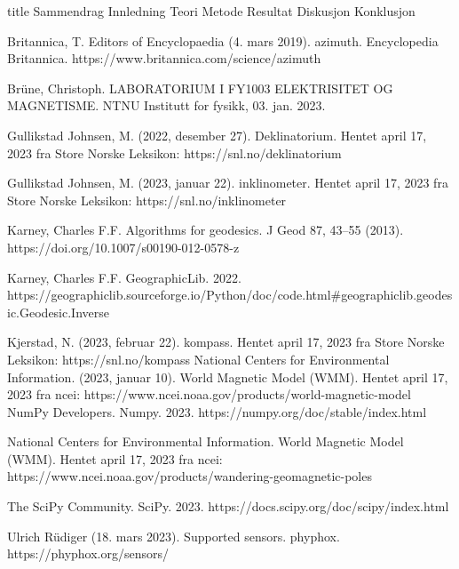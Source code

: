 \documentclass[5p]{article}
\begin{document}
{title} %
{Sammendrag}
\pagebreak
{Innledning}
{Teori}
{Metode}
{Resultat}
{Diskusjon}
{Konklusjon}

\begin{thebibliography}{5}
 Britannica, T. Editors of Encyclopaedia (4. mars 2019). azimuth. Encyclopedia Britannica. https://www.britannica.com/science/azimuth

Brüne, Christoph. LABORATORIUM I FY1003 ELEKTRISITET OG MAGNETISME. NTNU Institutt for fysikk, 03. jan. 2023.


Gullikstad Johnsen, M. (2022, desember 27). Deklinatorium. Hentet april 17, 2023 fra Store Norske Leksikon: https://snl.no/deklinatorium

Gullikstad Johnsen, M. (2023, januar 22). inklinometer. Hentet april 17, 2023 fra Store Norske Leksikon: https://snl.no/inklinometer

 Karney, Charles F.F. Algorithms for geodesics. J Geod 87, 43–55 (2013). https://doi.org/10.1007/s00190-012-0578-z

Karney, Charles F.F. GeographicLib. 2022. \\
https://geographiclib.sourceforge.io/Python/doc/code.html\#geographiclib.geodesic.Geodesic.Inverse

Kjerstad, N. (2023, februar 22). kompass. Hentet april 17, 2023 fra Store Norske Leksikon: https://snl.no/kompass
National Centers for Environmental Information. (2023, januar 10). World Magnetic Model (WMM). Hentet april 17, 
2023 fra ncei: https://www.ncei.noaa.gov/products/world-magnetic-model
 NumPy Developers. Numpy. 2023. https://numpy.org/doc/stable/index.html

National Centers for Environmental Information. World Magnetic Model (WMM). Hentet april 17, 
2023 fra ncei: https://www.ncei.noaa.gov/products/wandering-geomagnetic-poles

 The SciPy Community. SciPy. 2023. 
https://docs.scipy.org/doc/scipy/index.html

 Ulrich Rüdiger (18. mars 2023). Supported sensors. phyphox. 
https://phyphox.org/sensors/

\end{thebibliography}
\end{document}
